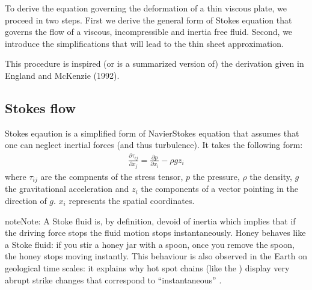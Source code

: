 \documentclass[letterpaper,10pt,english]{jupyterBook}
\begin{document}
\sphinxAtStartPar
To derive the equation governing the deformation of a thin viscous plate, we proceed in two steps. First we derive the general form of Stokes equation that governs the flow of a viscous, incompressible and inertia free fluid. Second, we introduce the simplifications that will lead to the thin sheet approximation.

\sphinxAtStartPar
This procedure is inspired (or is a summarized version of) the derivation given in England and McKenzie (1992).

\sphinxstepscope


\subsection{Stokes flow}
\label{\detokenize{stokes:stokes-flow}}\label{\detokenize{stokes::doc}}
\sphinxAtStartPar
Stokes eqaution is a simplified form of Navier\sphinxhyphen{}Stokes equation that assumes that one can neglect inertial forces (and thus turbulence). It takes the following form:
\begin{equation}\label{equation:stokes:stokes-force}
\begin{split}\frac{\partial\tau_{ij}}{\partial x_j}=\frac{\partial p}{\partial x_i}-\rho gz_i\end{split}
\end{equation}
\sphinxAtStartPar
where \(\tau_{ij}\) are the compnents of the stress tensor, \(p\) the pressure, \(\rho\) the density, \(g\) the gravitational acceleration and \(z_i\) the components of a vector pointing in the direction of \(g\). \(x_i\) represents the spatial coordinates.

\begin{sphinxadmonition}{note}{Note:}
\sphinxAtStartPar
A Stoke fluid is, by definition, devoid of inertia which implies that if the driving force stops the fluid motion stops instantaneously. Honey behaves like a Stoke fluid: if you stir a honey jar with a spoon, once you remove the spoon, the honey stops moving instantly. This behaviour is also observed in the Earth on geological time scales: it explains why hot spot chains (like the ) display very abrupt strike changes that correspond to “instantaneous” .
\end{sphinxadmonition}
\end{document}
